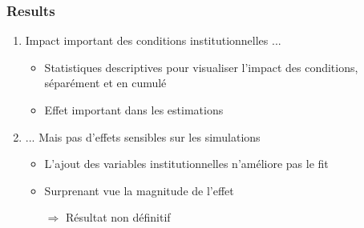 \documentclass[xcolor=table,ignorenonframetext,12pt]{beamer}
\newenvironment{choixmarges}[2]{\begin{list}{}{%
\setlength{\topsep}{0pt}%
\setlength{\leftmargin}{0pt}%
\setlength{\rightmargin}{0pt}%
\setlength{\listparindent}{\parindent}%
\setlength{\itemindent}{\parindent}%
\setlength{\parsep}{0pt plus 1pt}%
\addtolength{\leftmargin}{#1}%
\addtolength{\rightmargin}{#2}%
}\item }{\end{list}}
\begin{document}
\begin{frame}

\frametitle{Results}

\begin{choixmarges}{-0.5cm}{-0.5cm}
\begin{enumerate}
\vspace{0.2cm}
\item Impact important des conditions institutionnelles ...
\begin{itemize}
\item Statistiques descriptives pour visualiser l'impact des conditions, séparément et en cumulé
\item Effet important dans les estimations
\end{itemize}

\vspace{0.2cm}
\item ... Mais pas d'effets sensibles sur les simulations
\begin{itemize}
\item L'ajout des variables institutionnelles n'améliore pas le fit
\item Surprenant vue la magnitude de l'effet
\item[$\Rightarrow$] Résultat non définitif
\end{itemize}

\end{enumerate}
\end{choixmarges}
\end{frame}
\end{document}
